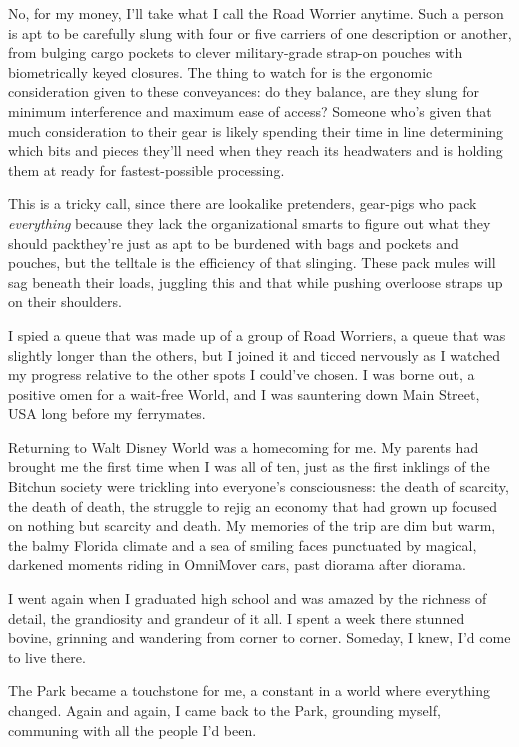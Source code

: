 No, for my money, I'll take what I call the Road Worrier anytime.
Such a person is apt to be carefully slung with four or five
carriers of one description or another, from bulging cargo pockets
to clever military-grade strap-on pouches with biometrically keyed
closures. The thing to watch for is the ergonomic consideration
given to these conveyances: do they balance, are they slung for
minimum interference and maximum ease of access? Someone who's
given that much consideration to their gear is likely spending
their time in line determining which bits and pieces they'll need
when they reach its headwaters and is holding them at ready for
fastest-possible processing.

This is a tricky call, since there are lookalike pretenders,
gear-pigs who pack \emph{everything} because they lack the
organizational smarts to figure out what they should pack{\dash}they're
just as apt to be burdened with bags and pockets and pouches, but
the telltale is the efficiency of that slinging. These pack mules
will sag beneath their loads, juggling this and that while pushing
overloose straps up on their shoulders.

I spied a queue that was made up of a group of Road Worriers, a
queue that was slightly longer than the others, but I joined it and
ticced nervously as I watched my progress relative to the other
spots I could've chosen. I was borne out, a positive omen for a
wait-free World, and I was sauntering down Main Street, USA long
before my ferrymates.

Returning to Walt Disney World was a homecoming for me. My parents
had brought me the first time when I was all of ten, just as the
first inklings of the Bitchun society were trickling into
everyone's consciousness: the death of scarcity, the death of
death, the struggle to rejig an economy that had grown up focused
on nothing but scarcity and death. My memories of the trip are dim
but warm, the balmy Florida climate and a sea of smiling faces
punctuated by magical, darkened moments riding in OmniMover cars,
past diorama after diorama.

I went again when I graduated high school and was amazed by the
richness of detail, the grandiosity and grandeur of it all. I spent
a week there stunned bovine, grinning and wandering from corner to
corner. Someday, I knew, I'd come to live there.

The Park became a touchstone for me, a constant in a world where
everything changed. Again and again, I came back to the Park,
grounding myself, communing with all the people I'd been.

